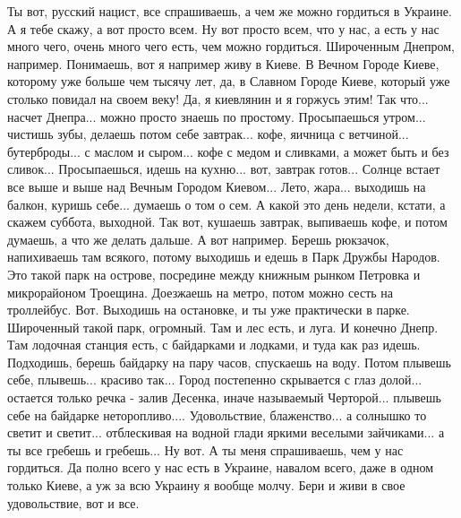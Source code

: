  
 
 
 
 

Ты вот, русский нацист, все спрашиваешь, а чем же можно гордиться в Украине. А
я тебе скажу, а вот просто всем. Ну вот просто всем, что у нас, а есть у нас
много чего, очень много чего есть, чем можно гордиться. Широченным Днепром,
например. Понимаешь, вот я например живу в Киеве.  В Вечном Городе Киеве,
которому уже больше чем тысячу лет, да, в Славном Городе Киеве, который уже
столько повидал на своем веку! Да, я киевлянин и я горжусь этим! Так что...
насчет Днепра... можно просто знаешь по простому. Просыпаешься утром... чистишь
зубы, делаешь потом себе завтрак... кофе, яичница с ветчиной... бутерброды... с
маслом и сыром... кофе с медом и сливками, а может быть и без сливок...
Просыпаешься, идешь на кухню... вот, завтрак готов...  Солнце встает все выше и
выше над Вечным Городом Киевом... Лето, жара...  выходишь на балкон, куришь
себе... думаешь о том о сем. А какой это день недели, кстати, а скажем суббота,
выходной. Так вот, кушаешь завтрак, выпиваешь кофе, и потом думаешь, а что же
делать дальше. А вот например. Берешь рюкзачок, напихиваешь там всякого, потому
выходишь и едешь в Парк Дружбы Народов. Это такой парк на острове, посредине
между книжным рынком Петровка и микрорайоном Троещина. Доезжаешь на метро,
потом можно сесть на троллейбус. Вот. Выходишь на остановке, и ты уже
практически в парке. Широченный такой парк, огромный. Там и лес есть, и луга. И
конечно Днепр. Там лодочная станция есть, с байдарками и лодками, и туда как
раз идешь. Подходишь, берешь байдарку на пару часов, спускаешь на воду. Потом
плывешь себе, плывешь... красиво так... Город постепенно скрывается с глаз
долой... остается только речка - залив Десенка, иначе называемый Черторой...
плывешь себе на байдарке неторопливо....  Удовольствие, блаженство... а
солнышко то светит и светит... отблескивая на водной глади яркими веселыми
зайчиками... а ты все гребешь и гребешь... Ну вот.  А ты меня спрашиваешь, чем
у нас гордиться. Да полно всего у нас есть в Украине, навалом всего, даже в
одном только Киеве, а уж за всю Украину я вообще молчу.  Бери и живи в свое
удовольствие, вот и все.
